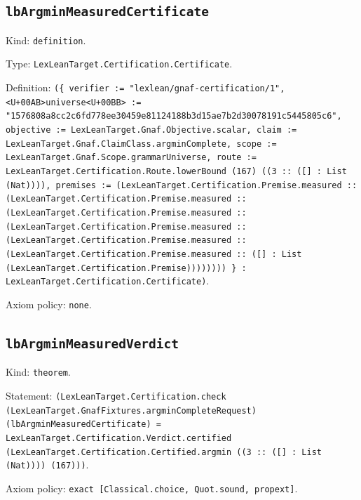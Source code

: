 \documentclass[11pt]{article}
\begin{document}
\subsection*{\texttt{lbArgminMeasuredCertificate}}
\noindent Kind: \texttt{definition}.\par
\noindent Type: \texttt{LexLeanTarget.Certification.Certificate}.\par
\noindent Definition: \texttt{(\{ verifier := "lexlean/gnaf-certification/1", <U+00AB>universe<U+00BB> := "1576808a8cc2c6fd778ee30459e81124188b3d15ae7b2d30078191c5445805c6", objective := LexLeanTarget.Gnaf.Objective.scalar, claim := LexLeanTarget.Gnaf.ClaimClass.argminComplete, scope := LexLeanTarget.Gnaf.Scope.grammarUniverse, route := LexLeanTarget.Certification.Route.lowerBound (167) ((3 :: ([] : List (Nat)))), premises := (LexLeanTarget.Certification.Premise.measured :: (LexLeanTarget.Certification.Premise.measured :: (LexLeanTarget.Certification.Premise.measured :: (LexLeanTarget.Certification.Premise.measured :: (LexLeanTarget.Certification.Premise.measured :: (LexLeanTarget.Certification.Premise.measured :: ([] : List (LexLeanTarget.Certification.Premise)))))))) \} : LexLeanTarget.Certification.Certificate)}.\par
\noindent Axiom policy: \texttt{none}.\par
\subsection*{\texttt{lbArgminMeasuredVerdict}}
\noindent Kind: \texttt{theorem}.\par
\noindent Statement: \texttt{(LexLeanTarget.Certification.check (LexLeanTarget.GnafFixtures.argminCompleteRequest) (lbArgminMeasuredCertificate) = LexLeanTarget.Certification.Verdict.certified (LexLeanTarget.Certification.Certified.argmin ((3 :: ([] : List (Nat)))) (167)))}.\par
\noindent Axiom policy: \texttt{exact [Classical.choice, Quot.sound, propext]}.\par
\end{document}
